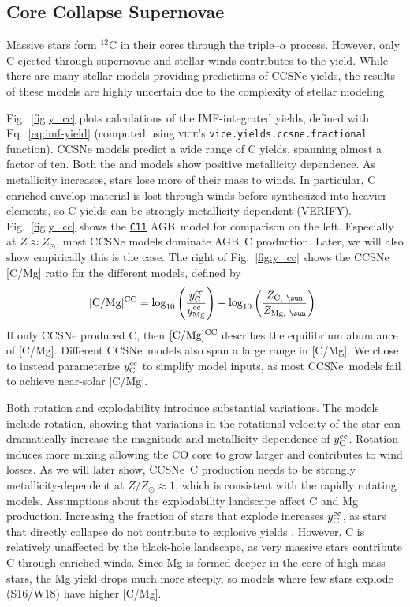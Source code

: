 \documentclass[fleqn,usenatbib]{mnras}
\newcommand{\VICE}{\textsc{vice}}
\newcommand{\cxi}{\texttt{\hyperlink{C11}{C11}}}
\newcommand{\agb}{AGB}
\newcommand{\cc}{CCSNe}
\newcommand{\imf}{IMF}
\newcommand{\hms}{high-mass stars}
\newcommand{\Ycc}{\ensuremath{y_{\rm C}^{\rm cc}}}
\newcommand{\Yoc}{\ensuremath{y_{\rm Mg}^{\rm cc}}}
\begin{document}
\subsection{Core Collapse Supernovae}


Massive stars form $^{12}$C in their cores through the triple--$\alpha$ process. However, only C ejected through supernovae and stellar winds contributes to the yield. 
While there are many stellar models providing predictions of \cc{} yields, the results of these models are highly uncertain due to the complexity of stellar modeling.

Fig.~\ref{fig:y_cc} plots calculations of the \imf-integrated yields, defined with Eq.~\ref{eq:imf-yield} (computed using \VICE's \texttt{vice.yields.ccsne.fractional} function). 
\cc{} models predict a wide range of C yields, spanning almost a factor of ten. 
Both the \citet{NKT13} and \cite{LC18} models show positive metallicity dependence. 
As metallicity increases, stars lose more of their mass to winds. In particular, C enriched envelop material is lost through winds before synthesized into heavier elements, so C yields can be strongly metallicity dependent (VERIFY).
Fig.~\ref{fig:y_cc} shows the \cxi{} \agb\ model for comparison on the left. Especially at $Z\approx Z_\odot$, most \cc{} models dominate \agb\ C production. Later, we will also show empirically this is the case.
The right of Fig.~\ref{fig:y_cc} shows the \cc{} [C/Mg] ratio for the different models, defined by
\begin{equation}\label{eq:c_mg_cc}
    {\rm [C/Mg]^{CC}} = \log_{10}\left( \frac{\Ycc}{\Yoc}\right) - \log_{10} \left( \frac{Z_{{\rm C},\ \sun }}{Z_{{\rm Mg},\ \sun }} \right).
\end{equation}
If only \cc{} produced C, then ${\rm [C/Mg]^{CC}}$ describes the equilibrium abundance of [C/Mg].
Different \cc\ models also span a large range in [C/Mg]. 
We chose to instead parameterize $\Ycc$ to simplify model inputs, as most \cc\ models fail to achieve near-solar [C/Mg].

Both rotation and explodability introduce substantial variations. The \cite{LC18} models include rotation, showing that variations in the rotational velocity of the star can dramatically increase the magnitude and metallicity dependence of $\Ycc$. Rotation induces more mixing allowing the CO core to grow larger and contributes to wind losses. As we will later show, \cc\ C production needs to be strongly metallicity-dependent at $Z/Z_\odot \approx 1$, which is consistent with the \cite{LC18} rapidly rotating models.
Assumptions about the explodability landscape affect C and Mg production. Increasing the fraction of stars that explode increases $\Ycc$, as stars that directly collapse do not contribute to explosive yields \citep{emily+21}. However, C is relatively unaffected by the black-hole landscape, as very massive stars contribute C through enriched winds. Since Mg is formed deeper in the core of \hms, the Mg yield drops much more steeply, so models where few stars explode (S16/W18) have higher [C/Mg].
\end{document}
